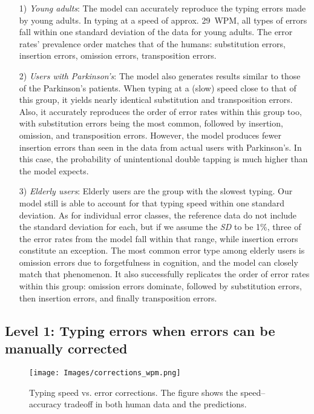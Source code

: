 \begin{itemize}
    \item[1)] \textit{Young adults}: The model can accurately reproduce the typing errors made by young adults. In typing at a speed of approx. 29~WPM, all types of errors fall within one standard deviation of the data for young adults. The error rates' prevalence order matches that of the humans: substitution errors, insertion errors, omission errors, transposition errors. 
    \item[2)] \textit{Users with Parkinson's}: The model also generates results similar to those of the Parkinson's patients. When typing at a (slow) speed close to that of this group, it yields nearly identical substitution and transposition errors. Also, it accurately reproduces the order of error rates within this group too, with substitution errors being the most common, followed by insertion, omission, and transposition errors. However, the model produces fewer insertion errors than seen in the data from actual users with Parkinson's. In this case, the probability of unintentional double tapping is much higher than the model expects.
    \item[3)] \textit{Elderly users}: Elderly users are the group with the slowest typing. Our model still is able to account for that typing speed within one standard deviation. As for individual error classes, the reference data do not include the standard deviation for each, but if we assume the \emph{SD} to be 1\%, three of the error rates from the model fall within that range, while insertion errors constitute an exception. The most common error type among elderly users is omission errors due to forgetfulness in cognition, and the model can closely match that phenomenon. It also successfully replicates the order of error rates within this group: omission errors dominate, followed by substitution errors, then insertion errors, and finally transposition errors.
\end{itemize}

\subsection{Level 1: Typing errors when errors can be manually corrected}

\begin{figure*}[!t]
\centering
  \texttt{[image: Images/corrections\_wpm.png]}
  \caption{Typing speed vs. error corrections. The figure shows the speed--accuracy tradeoff in both human data and the predictions.
}
  \label{fig:corrections_wpm}
  \vspace{-3mm}
\end{figure*}

